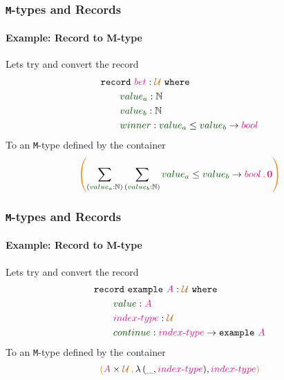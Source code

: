 \documentclass[xelatex,mathserif,serif,notheorems]{beamer} %
\theoremstyle{plain} %
\theoremstyle{definition}
\theoremstyle{remark}
\newcommand*{\term}[1]{\textcolor{green!30!black}{#1}} %
\newcommand*{\type}[1]{\textcolor{magenta!90!black}{#1}}
\newcommand*{\containerpair}[2]{\ensuremath{\colorlet{savedleftcolor}{.}\color{orange}\left(\color{savedleftcolor}#1\,\textcolor{orange}{\mathbf{,}}\,#2\color{orange}\right)\color{savedleftcolor}}}
\newcommand*{\universe}[1]{\textcolor{orange!80!black}{#1}}
\newcommand*{\empt}{\type{\textbf{0}}}
\newcommand*{\typeformer}[1]{\ensuremath{\mathtt{#1}}}
\begin{document}
\begin{frame}
  \frametitle{\texttt{M}-types and Records}
  \framesubtitle{Example: Record to M-type}
  Lets try and convert the record
  \begin{equation}
    \begin{aligned}
      &\mathtt{record}~\type{bet} : \universe{\mathcal{U} }~\mathtt{where} \\
      &\qquad \term{value_a} : \mathbb{N} \\
      &\qquad \term{value_b} : \mathbb{N} \\
      &\qquad \term{winner} : \term{value_a} \leq \term{value_b} \rightarrow \type{bool} \\
    \end{aligned}
  \end{equation}
  To an \texttt{M}-type defined by the container
  \begin{equation}
    \containerpair{\sum_{(\term{value_a} : \mathbb{N})} \sum_{(\term{value_b} : \mathbb{N})} \term{value_a} \leq \term{value_b} \rightarrow \type{bool}}{\empt}
  \end{equation}
\end{frame}


\begin{frame}
  \frametitle{\texttt{M}-types and Records}
  \framesubtitle{Example: Record to M-type}
  Lets try and convert the record
  \begin{equation}
    \begin{aligned}
      &\mathtt{record}~\typeformer{example}~\type{A} : \universe{\mathcal{U} }~\mathtt{where} \\
      &\qquad \term{value} : \type{A} \\
      &\qquad \type{index\text{-}type} : \universe{\mathcal{U}} \\
      &\qquad \term{continue} : \type{index\text{-}type} \rightarrow \typeformer{example}~\type{A} \\
    \end{aligned}
  \end{equation}
  To an \texttt{M}-type defined by the container
  \begin{equation}
    \containerpair{\type{A} \times \universe{\mathcal{U}}}{\lambda\,(\_,\type{index\text{-}type}), \type{index\text{-}type}}
  \end{equation}
\end{frame}
\end{document}
